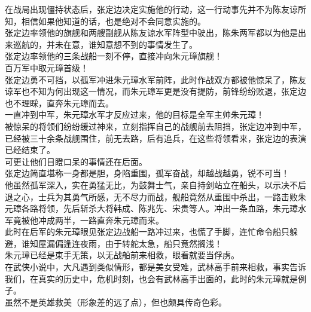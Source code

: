 \begin{multicols}{\theparacolNo}
在战局出现僵持状态后，张定边决定实施他的行动，这一行动事先并不为陈友谅所知，相信如果他知道的话，也是绝对不会同意实施的。\\

张定边率领他的旗舰和两艘副舰从陈友谅水军阵型中驶出，陈朱两军都以为他是出来巡航的，并未在意，谁知意想不到的事情发生了。\\

张定边率领他的三条战船一刻不停，直接冲向朱元璋旗舰！\\

百万军中取元璋首级！\\

张定边勇不可挡，以孤军冲进朱元璋水军前阵，此时作战双方都被他惊呆了，陈友谅军也不知为何出现这一情况，而朱元璋军更是没有提防，前锋纷纷败退，张定边也不理睬，直奔朱元璋而去。\\

一直冲到中军，朱元璋水军才反应过来，他的目标是全军主帅朱元璋！\\

被惊呆的将领们纷纷缓过神来，立刻指挥自己的战舰前去阻挡，张定边冲到中军，已经被三十余条战舰围住，前无去路，后有追兵，在这些将领看来，张定边的表演已经结束了。\\

可更让他们目瞪口呆的事情还在后面。\\

张定边简直堪称一身都是胆，身陷重围，孤军奋战，却越战越勇，锐不可当！\\

他虽然孤军深入，实在勇猛无比，为鼓舞士气，亲自持剑站立在船头，以示决不后退之心，士兵为其勇气所感，无不尽力而战，舰船竟然从重围中杀出，一路击败朱元璋各路将领，先后斩杀大将韩成、陈兆先、宋贵等人。冲出一条血路，朱元璋水军竟被他冲成两半，一路直奔朱元璋而来。\\

此时在后军的朱元璋眼见张定边战船一路冲过来，也慌了手脚，连忙命令船只躲避，谁知屋漏偏逢连夜雨，由于转舵太急，船只竟然搁浅！\\

朱元璋已经是束手无策，以无战船前来相救，眼看就要当俘虏。\\

在武侠小说中，大凡遇到类似情形，都是美女受难，武林高手前来相救，事实告诉我们，在真实的历史中，危机时刻，也会有武林高手出面的，此时的朱元璋就是例子。\\

虽然不是英雄救美（形象差的远了点），但也颇具传奇色彩。\\


\end{multicols}
